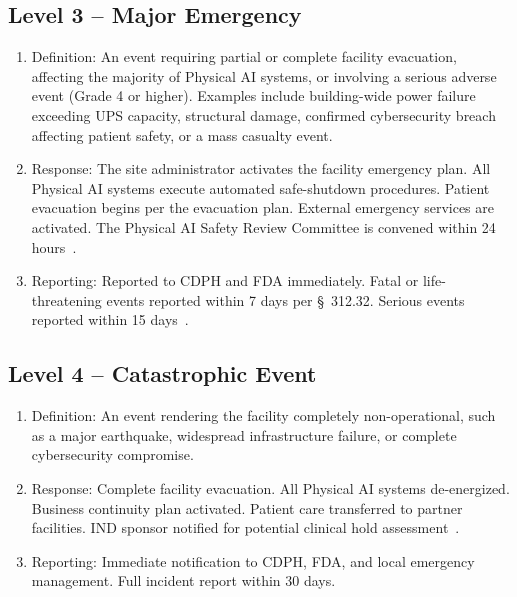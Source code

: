 \documentclass[11pt,letterpaper]{article}
\begin{document}
\subsection{Level 3 -- Major Emergency}

\begin{enumerate}[label=(\alph*)]
\item Definition: An event requiring partial or complete facility evacuation,
  affecting the majority of Physical AI systems, or involving a serious
  adverse event (Grade 4 or higher). Examples include building-wide power
  failure exceeding UPS capacity, structural damage, confirmed cybersecurity
  breach affecting patient safety, or a mass casualty event.

\item Response: The site administrator activates the facility emergency plan.
  All Physical AI systems execute automated safe-shutdown procedures. Patient
  evacuation begins per the evacuation plan. External emergency services are
  activated. The Physical AI Safety Review Committee is convened within 24
  hours~\cite{cfr312adapt}.

\item Reporting: Reported to CDPH and FDA immediately. Fatal or
  life-threatening events reported within 7 days per \S~312.32. Serious
  events reported within 15 days~\cite{cfr312adapt}.
\end{enumerate}

\subsection{Level 4 -- Catastrophic Event}

\begin{enumerate}[label=(\alph*)]
\item Definition: An event rendering the facility completely non-operational,
  such as a major earthquake, widespread infrastructure failure, or complete
  cybersecurity compromise.

\item Response: Complete facility evacuation. All Physical AI systems
  de-energized. Business continuity plan activated. Patient care transferred
  to partner facilities. IND sponsor notified for potential clinical
  hold assessment~\cite{cfr312adapt}.

\item Reporting: Immediate notification to CDPH, FDA, and local emergency
  management. Full incident report within 30 days.
\end{enumerate}
\end{document}
